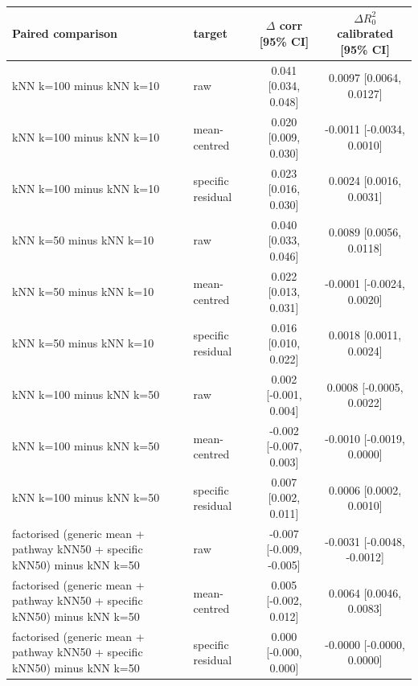 \begin{tabular}{llcc}
\toprule
Paired comparison & target & $\Delta$ corr [95\% CI] & $\Delta R^2_0$ calibrated [95\% CI] \\
\midrule
kNN k=100 minus kNN k=10 & raw & 0.041 [0.034, 0.048] & 0.0097 [0.0064, 0.0127] \\
kNN k=100 minus kNN k=10 & mean-centred & 0.020 [0.009, 0.030] & -0.0011 [-0.0034, 0.0010] \\
kNN k=100 minus kNN k=10 & specific residual & 0.023 [0.016, 0.030] & 0.0024 [0.0016, 0.0031] \\
kNN k=50 minus kNN k=10 & raw & 0.040 [0.033, 0.046] & 0.0089 [0.0056, 0.0118] \\
kNN k=50 minus kNN k=10 & mean-centred & 0.022 [0.013, 0.031] & -0.0001 [-0.0024, 0.0020] \\
kNN k=50 minus kNN k=10 & specific residual & 0.016 [0.010, 0.022] & 0.0018 [0.0011, 0.0024] \\
kNN k=100 minus kNN k=50 & raw & 0.002 [-0.001, 0.004] & 0.0008 [-0.0005, 0.0022] \\
kNN k=100 minus kNN k=50 & mean-centred & -0.002 [-0.007, 0.003] & -0.0010 [-0.0019, 0.0000] \\
kNN k=100 minus kNN k=50 & specific residual & 0.007 [0.002, 0.011] & 0.0006 [0.0002, 0.0010] \\
factorised (generic mean + pathway kNN50 + specific kNN50) minus kNN k=50 & raw & -0.007 [-0.009, -0.005] & -0.0031 [-0.0048, -0.0012] \\
factorised (generic mean + pathway kNN50 + specific kNN50) minus kNN k=50 & mean-centred & 0.005 [-0.002, 0.012] & 0.0064 [0.0046, 0.0083] \\
factorised (generic mean + pathway kNN50 + specific kNN50) minus kNN k=50 & specific residual & 0.000 [-0.000, 0.000] & -0.0000 [-0.0000, 0.0000] \\
\bottomrule
\end{tabular}